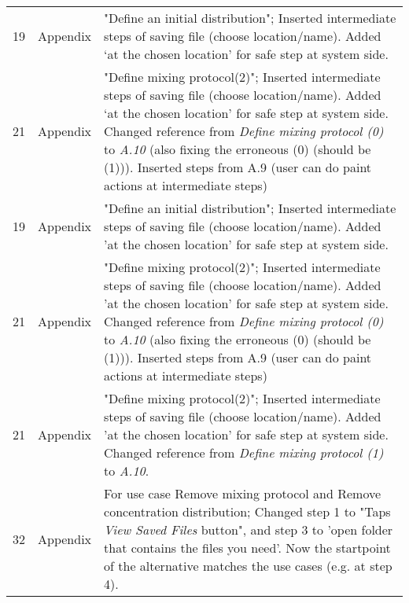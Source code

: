 \begin{longtable}{|l|l|p{11cm}|}
    19 & Appendix & "Define an initial distribution"; Inserted intermediate steps of saving file (choose location/name). Added `at the chosen location' for safe step at system side.\\
    21 & Appendix & "Define mixing protocol(2)"; Inserted intermediate steps of saving file (choose location/name). Added `at the chosen location' for safe step at system side. Changed reference from \emph{Define mixing protocol (0)} to \emph{A.10} (also fixing the erroneous (0) (should be (1))). Inserted steps from A.9 (user can do paint actions at intermediate steps) \\
    19 & Appendix & "Define an initial distribution"; Inserted intermediate steps of saving file (choose location/name). Added 'at the chosen location' for safe step at system side.\\
    21 & Appendix & "Define mixing protocol(2)"; Inserted intermediate steps of saving file (choose location/name). Added 'at the chosen location' for safe step at system side. Changed reference from \emph{Define mixing protocol (0)} to \emph{A.10} (also fixing the erroneous (0) (should be (1))). Inserted steps from A.9 (user can do paint actions at intermediate steps) \\
    21 & Appendix & "Define mixing protocol(2)"; Inserted intermediate steps of saving file (choose location/name). Added 'at the chosen location' for safe step at system side. Changed reference from \emph{Define mixing protocol (1)} to \emph{A.10}.\\
    32 & Appendix & For use case Remove mixing protocol and Remove concentration distribution; Changed step 1 to "Taps \emph{View Saved Files} button", and step 3 to 'open folder that contains the files you need'. Now the startpoint of the alternative matches the use cases (e.g. at step 4). 

\end{longtable}

